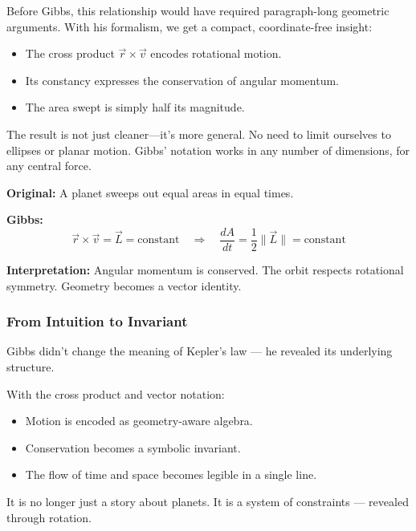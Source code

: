 Before Gibbs, this relationship would have required paragraph-long geometric arguments.  
With his formalism, we get a compact, coordinate-free insight:

\begin{itemize}
    \item The cross product \( \vec{r} \times \vec{v} \) encodes rotational motion.
    \item Its constancy expresses the conservation of angular momentum.
    \item The area swept is simply half its magnitude.
\end{itemize}

The result is not just cleaner—it’s more general.  
No need to limit ourselves to ellipses or planar motion. Gibbs’ notation works in any number of dimensions, for any central force.

\begin{tcolorbox}[colback=blue!5!white, colframe=blue!50!black, title={Kepler’s Law, in Gibbsian Notation}]
\textbf{Original:}  
A planet sweeps out equal areas in equal times.

\textbf{Gibbs:}  
\[
\vec{r} \times \vec{v} = \vec{L} = \text{constant}
\quad \Rightarrow \quad
\frac{dA}{dt} = \frac{1}{2} \|\vec{L}\| = \text{constant}
\]

\textbf{Interpretation:}  
Angular momentum is conserved.  
The orbit respects rotational symmetry.  
Geometry becomes a vector identity.
\end{tcolorbox}

\subsubsection*{From Intuition to Invariant}

Gibbs didn’t change the meaning of Kepler’s law — he revealed its underlying structure.

With the cross product and vector notation:
\begin{itemize}
    \item Motion is encoded as geometry-aware algebra.
    \item Conservation becomes a symbolic invariant.
    \item The flow of time and space becomes legible in a single line.
\end{itemize}

It is no longer just a story about planets.  
It is a system of constraints — revealed through rotation.
